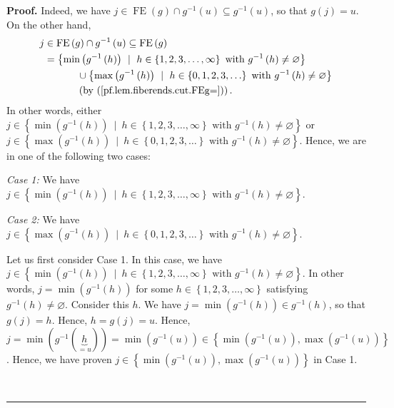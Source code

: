 \documentclass[numbers=enddot,12pt,final,onecolumn,notitlepage]{scrartcl}%
\theoremstyle{definition}
\newenvironment{proof}[1][Proof]{\noindent\textbf{#1.} }{\ \rule{0.5em}{0.5em}}
\newenvironment{verlong}{}{}
\begin{document}
\begin{verlong}
\begin{proof}
Indeed, we have $j\in\operatorname*{FE}\left(  g\right)  \cap g^{-1}\left(
u\right)  \subseteq g^{-1}\left(  u\right)  $, so that $g\left(  j\right)
=u$. On the other hand,%
\begin{align*}
j  &  \in\operatorname*{FE}\left(  g\right)  \cap g^{-1}\left(  u\right)
\subseteq\operatorname*{FE}\left(  g\right) \\
&  =\left\{  \min\left(  g^{-1}\left(  h\right)  \right)  \ \mid\ h\in\left\{
1,2,3,\ldots,\infty\right\}  \text{ with }g^{-1}\left(  h\right)
\neq\varnothing\right\} \\
&  \ \ \ \ \ \ \ \ \ \ \cup\left\{  \max\left(  g^{-1}\left(  h\right)
\right)  \ \mid\ h\in\left\{  0,1,2,3,\ldots\right\}  \text{ with }%
g^{-1}\left(  h\right)  \neq\varnothing\right\} \\
&  \ \ \ \ \ \ \ \ \ \ \left(  \text{by (\ref{pf.lem.fiberends.cut.FEg=}%
)}\right)  .
\end{align*}
In other words, either $j\in\left\{  \min\left(  g^{-1}\left(  h\right)
\right)  \ \mid\ h\in\left\{  1,2,3,\ldots,\infty\right\}  \text{ with }%
g^{-1}\left(  h\right)  \neq\varnothing\right\}  $ or $j\in\left\{
\max\left(  g^{-1}\left(  h\right)  \right)  \ \mid\ h\in\left\{
0,1,2,3,\ldots\right\}  \text{ with }g^{-1}\left(  h\right)  \neq
\varnothing\right\}  $. Hence, we are in one of the following two cases:

\textit{Case 1:} We have $j\in\left\{  \min\left(  g^{-1}\left(  h\right)
\right)  \ \mid\ h\in\left\{  1,2,3,\ldots,\infty\right\}  \text{ with }%
g^{-1}\left(  h\right)  \neq\varnothing\right\}  $.

\textit{Case 2:} We have $j\in\left\{  \max\left(  g^{-1}\left(  h\right)
\right)  \ \mid\ h\in\left\{  0,1,2,3,\ldots\right\}  \text{ with }%
g^{-1}\left(  h\right)  \neq\varnothing\right\}  $.

Let us first consider Case 1. In this case, we have \newline$j\in\left\{
\min\left(  g^{-1}\left(  h\right)  \right)  \ \mid\ h\in\left\{
1,2,3,\ldots,\infty\right\}  \text{ with }g^{-1}\left(  h\right)
\neq\varnothing\right\}  $. In other words, $j=\min\left(  g^{-1}\left(
h\right)  \right)  $ for some $h\in\left\{  1,2,3,\ldots,\infty\right\}  $
satisfying $g^{-1}\left(  h\right)  \neq\varnothing$. Consider this $h$. We
have $j=\min\left(  g^{-1}\left(  h\right)  \right)  \in g^{-1}\left(
h\right)  $, so that $g\left(  j\right)  =h$. Hence, $h=g\left(  j\right)
=u$. Hence, $j=\min\left(  g^{-1}\left(  \underbrace{h}_{=u}\right)  \right)
=\min\left(  g^{-1}\left(  u\right)  \right)  \in\left\{  \min\left(
g^{-1}\left(  u\right)  \right)  ,\max\left(  g^{-1}\left(  u\right)  \right)
\right\}  $. Hence, we have proven $j\in\left\{  \min\left(  g^{-1}\left(
u\right)  \right)  ,\max\left(  g^{-1}\left(  u\right)  \right)  \right\}  $
in Case 1.


\end{proof}
\end{verlong}
\end{document}
